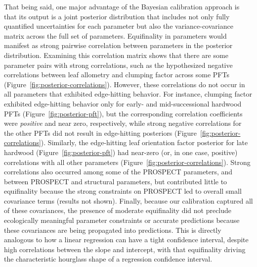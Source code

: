 That being said, one major advantage of the Bayesian calibration approach is that its output is a joint posterior distribution that includes not only fully quantified uncertainties for each parameter but also the variance-covariance matrix across the full set of parameters.
Equifinality in parameters would manifest as strong pairwise correlation between parameters in the posterior distribution.
Examining this correlation matrix shows that there are some parameter pairs with strong correlations, such as the hypothesized negative correlations between leaf allometry and clumping factor across some PFTs (Figure~\ref{fig:posterior-correlations}).
However, these correlations do not occur in all parameters that exhibited edge-hitting behavior.
For instance, clumping factor exhibited edge-hitting behavior only for early- and mid-successional hardwood PFTs (Figure~\ref{fig:posterior-pft}), but the corresponding correlation coefficients were \emph{positive} and near zero, respectively, while strong negative correlations for the other PFTs did not result in edge-hitting posteriors (Figure~\ref{fig:posterior-correlations}).
Similarly, the edge-hitting leaf orientation factor posterior for late hardwood (Figure~\ref{fig:posterior-pft}) had near-zero (or, in one case, positive) correlations with all other parameters (Figure~\ref{fig:posterior-correlations}).
Strong correlations also occurred among some of the PROSPECT parameters, and between PROSPECT and structural parameters,
but contributed little to equifinality because the strong constraints on PROSPECT led to overall small covariance terms (results not shown).
Finally, because our calibration captured all of these covariances, the presence of moderate equifinality did not preclude ecologically meaningful parameter constraints or accurate predictions because these covariances are being propagated into predictions.
This is directly analogous to how a linear regression can have a tight confidence interval, despite high correlations between the slope and intercept, with that equifinality driving the characteristic hourglass shape of a regression confidence interval.

